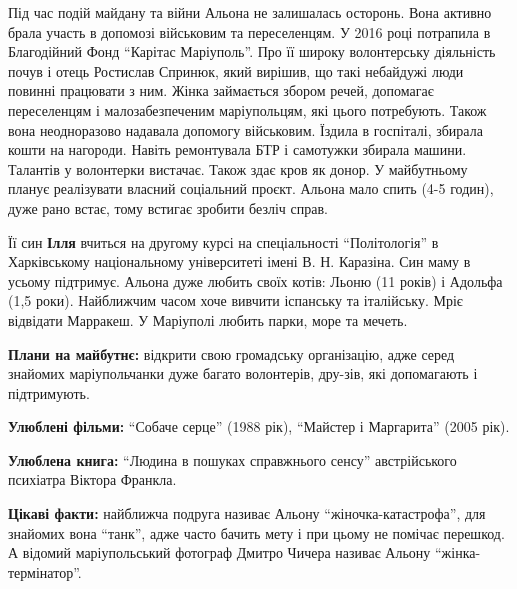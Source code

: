 Під час подій майдану та війни Альона не залишалась осторонь. Вона активно
брала участь в допомозі військовим та переселенцям. У 2016 році потрапила в
Благодійний Фонд \enquote{Карітас Маріуполь}. Про її широку волонтерську діяльність
почув і отець Ростислав Спринюк, який вирішив, що такі небайдужі люди повинні
працювати з ним. Жінка займається збором речей, допомагає переселенцям і
малозабезпеченим маріупольцям, які цього потребують. Також вона неодноразово
надавала допомогу військовим. Їздила в госпіталі, збирала кошти на нагороди.
Навіть ремонтувала БТР і самотужки збирала машини. Талантів у волонтерки
вистачає. Також здає кров як донор. У майбутньому планує реалізувати власний
соціальний проєкт. Альона мало спить (4-5 годин), дуже рано встає, тому
встигає зробити безліч справ.


Її син \textbf{Ілля} вчиться на другому курсі на
спеціальності \enquote{Політологія} в Харківському національному університеті імені В.
Н. Каразіна. Син маму в усьому підтримує. Альона дуже любить своїх котів: Льоню
(11 років) і Адольфа (1,5 роки). Найближчим часом хоче вивчити іспанську та
італійську. Мріє відвідати Марракеш. У Маріуполі любить парки, море та мечеть.


\textbf{Плани на майбутнє:} відкрити свою громадську організацію, адже серед знайомих
маріупольчанки дуже багато волонтерів, дру\hyp{}зів, які допомагають і підтримують.

\textbf{Улюблені фільми:} \enquote{Собаче серце} (1988 рік), \enquote{Майстер і Маргарита} (2005 рік).

\textbf{Улюблена книга:} \enquote{Людина в пошуках справжнього сенсу} австрійського психіатра
Віктора Франкла.

\textbf{Цікаві факти:} найближча подруга називає Альону \enquote{жіночка-катастрофа}, для
знайомих вона \enquote{танк}, адже часто бачить мету і при цьому не помічає перешкод. А
відомий маріупольський фотограф Дмитро Чичера називає Альону
\enquote{жінка-термінатор}.


